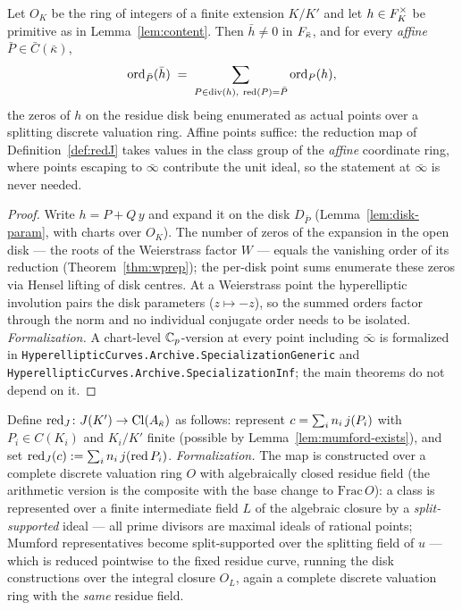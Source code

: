 \begin{theorem}
\label{thm:spec}
\leanok
{}
Let $O_K$ be the ring of integers of a finite extension $K/K'$ and let
$h \in F_{K}^\times$ be primitive as in Lemma~\ref{lem:content}. Then $\bar h \ne 0$ in
$F_{\bar\kappa}$, and for every \emph{affine} $\bar P \in \bar C(\bar\kappa)$,
\[ \operatorname{ord}_{\bar P}(\bar h) \;=\; \sum_{P \in \operatorname{div}(h),\ \operatorname{red}(P) = \bar P} \operatorname{ord}_P(h), \]
the zeros of $h$ on the residue disk being enumerated as actual points over a splitting
discrete valuation ring. Affine points suffice: the reduction map of
Definition~\ref{def:redJ} takes values in the class group of the \emph{affine}
coordinate ring, where points escaping to $\bar\infty$ contribute the unit ideal, so the
statement at $\bar\infty$ is never needed.
\end{theorem}
\begin{proof}
\leanok
Write $h = P + Q\,y$ and expand it on the disk $D_{\bar P}$ (Lemma~\ref{lem:disk-param},
with charts over $O_K$). The number of zeros of the expansion in the open disk --- the
roots of the Weierstrass factor $W$ --- equals the vanishing order of its reduction
(Theorem~\ref{thm:wprep}); the per-disk point sums enumerate these zeros via Hensel
lifting of disk centres. At a Weierstrass point the hyperelliptic involution pairs the
disk parameters ($z \mapsto -z$), so the summed orders factor through the norm and no
individual conjugate order needs to be isolated. \emph{Formalization.} A chart-level
$\mathbb{C}_p$-version at every point including $\bar\infty$ is formalized in
\texttt{HyperellipticCurves.Archive.SpecializationGeneric} and
\texttt{HyperellipticCurves.Archive.SpecializationInf}; the main theorems do not depend on
it.
\end{proof}

\begin{definition}
\label{def:redJ}
\leanok
{}
Define $\operatorname{red}_J \colon J(K') \to \operatorname{Cl}(A_{\bar\kappa})$ as follows: represent
$c = \sum_i n_i\,j(P_i)$ with $P_i \in C(K_i)$ and $K_i/K'$ finite (possible by
Lemma~\ref{lem:mumford-exists}), and set $\operatorname{red}_J(c) := \sum_i n_i\,j(\operatorname{red} P_i)$.
\emph{Formalization.} The map is constructed over a complete discrete valuation ring
$O$ with algebraically closed residue field (the arithmetic version is the composite
with the base change to $\mathrm{Frac}\,O$): a class is represented over a finite
intermediate field $L$ of the algebraic closure by a \emph{split-supported} ideal ---
all prime divisors are maximal ideals of rational points; Mumford representatives become
split-supported over the splitting field of $u$ --- which is reduced pointwise to the
fixed residue curve, running the disk constructions over the integral closure $O_L$,
again a complete discrete valuation ring with the \emph{same} residue field.
\end{definition}

